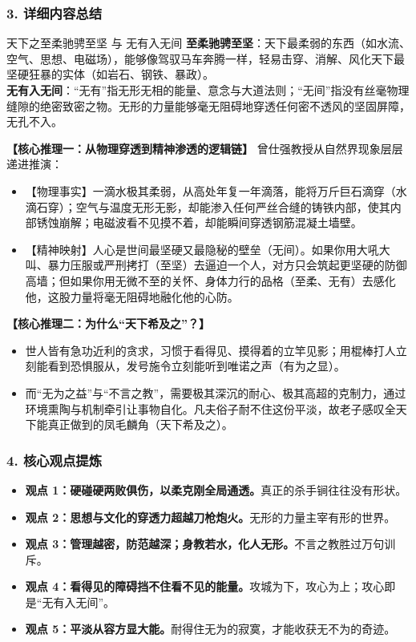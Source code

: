 \subsubsection{3. 详细内容总结}

\begin{ConceptBox}{天下之至柔驰骋至坚 与 无有入无间}
\textbf{至柔驰骋至坚}：天下最柔弱的东西（如水流、空气、思想、电磁场），能够像驾驭马车奔腾一样，轻易击穿、消解、风化天下最坚硬狂暴的实体（如岩石、钢铁、暴政）。\\
\textbf{无有入无间}：“无有”指无形无相的能量、意念与大道法则；“无间”指没有丝毫物理缝隙的绝密致密之物。无形的力量能够毫无阻碍地穿透任何密不透风的坚固屏障，无孔不入。
\end{ConceptBox}

\noindent\textbf{【核心推理一：从物理穿透到精神渗透的逻辑链】}
曾仕强教授从自然界现象层层递进推演：
\begin{itemize}
    \item 【物理事实】一滴水极其柔弱，从高处年复一年滴落，能将万斤巨石滴穿（水滴石穿）；空气与温度无形无影，却能渗入任何严丝合缝的铸铁内部，使其内部锈蚀崩解；电磁波看不见摸不着，却能瞬间穿透钢筋混凝土墙壁。
    \item 【精神映射】人心是世间最坚硬又最隐秘的壁垒（无间）。如果你用大吼大叫、暴力压服或严刑拷打（至坚）去逼迫一个人，对方只会筑起更坚硬的防御高墙；但如果你用无微不至的关怀、身体力行的品格（至柔、无有）去感化他，这股力量将毫无阻碍地融化他的心防。
\end{itemize}

\noindent\textbf{【核心推理二：为什么“天下希及之”？】}
\begin{itemize}
    \item 世人皆有急功近利的贪求，习惯于看得见、摸得着的立竿见影；用棍棒打人立刻能看到恐惧服从，发号施令立刻能听到唯诺之声（有为之显）。
    \item 而“无为之益”与“不言之教”，需要极其深沉的耐心、极其高超的克制力，通过环境熏陶与机制牵引让事物自化。凡夫俗子耐不住这份平淡，故老子感叹全天下能真正做到的凤毛麟角（天下希及之）。
\end{itemize}

\subsubsection{4. 核心观点提炼}
\begin{itemize}
    \item \textbf{观点 1：硬碰硬两败俱伤，以柔克刚全局通透。}真正的杀手锏往往没有形状。
    \item \textbf{观点 2：思想与文化的穿透力超越刀枪炮火。}无形的力量主宰有形的世界。
    \item \textbf{观点 3：管理越密，防范越深；身教若水，化人无形。}不言之教胜过万句训斥。
    \item \textbf{观点 4：看得见的障碍挡不住看不见的能量。}攻城为下，攻心为上；攻心即是“无有入无间”。
    \item \textbf{观点 5：平淡从容方显大能。}耐得住无为的寂寞，才能收获无不为的奇迹。
\end{itemize}

